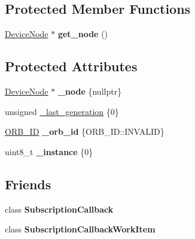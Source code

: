 \subsection*{Protected Member Functions}
\begin{DoxyCompactItemize}
\item 
\mbox{\label{classuORB_1_1Subscription_acfefc1961589348321e83851139512ce}} 
\hyperlink{classuORB_1_1DeviceNode}{Device\+Node} $\ast$ {\bfseries get\+\_\+node} ()
\end{DoxyCompactItemize}
\subsection*{Protected Attributes}
\begin{DoxyCompactItemize}
\item 
\mbox{\label{classuORB_1_1Subscription_a0d3a0c177af4386b4f3d306a1b995dbc}} 
\hyperlink{classuORB_1_1DeviceNode}{Device\+Node} $\ast$ {\bfseries \+\_\+node} \{nullptr\}
\item 
unsigned \hyperlink{classuORB_1_1Subscription_a994ab022fce2eb1c47b62444d9c5cca9}{\+\_\+last\+\_\+generation} \{0\}
\item 
\mbox{\label{classuORB_1_1Subscription_ab117a8b8e0b79caaf37847e1f208fa7b}} 
\hyperlink{uORB_8h_a96af5434ec1acdf24287bd7851b0413f}{O\+R\+B\+\_\+\+ID} {\bfseries \+\_\+orb\+\_\+id} \{O\+R\+B\+\_\+\+I\+D\+::\+I\+N\+V\+A\+L\+ID\}
\item 
\mbox{\label{classuORB_1_1Subscription_a96128476244a201e40b2ffe1ae2fee07}} 
uint8\+\_\+t {\bfseries \+\_\+instance} \{0\}
\end{DoxyCompactItemize}
\subsection*{Friends}
\begin{DoxyCompactItemize}
\item 
\mbox{\label{classuORB_1_1Subscription_a140e44567b16af0d25b0c7f04f2839c7}} 
class {\bfseries Subscription\+Callback}
\item 
\mbox{\label{classuORB_1_1Subscription_a1a53a356246a3520bc25153445812f1b}} 
class {\bfseries Subscription\+Callback\+Work\+Item}
\end{DoxyCompactItemize}



